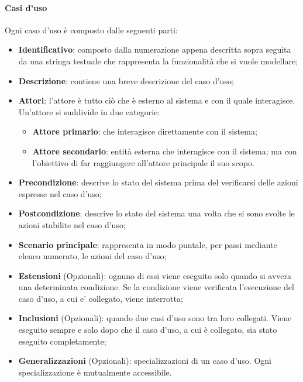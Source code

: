 \paragraph{Casi d'uso}\mbox{}
\label{Casi d'uso}
\noindent
Ogni caso d'uso è composto dalle seguenti parti:
      \begin{itemize}
      \item \textbf{Identificativo}: composto dalla numerazione appena descritta sopra seguita da una stringa testuale che rappresenta la funzionalità che si vuole modellare;
      \item \textbf{Descrizione}: contiene una breve descrizione del caso d'uso;
      \item \textbf{Attori}: l'attore è  tutto ciò che è esterno al sistema e con il quale interagisce. Un'attore si suddivide in due categorie:
        \begin{itemize}
        \item \textbf{Attore primario}: che interagisce direttamente con il sistema;
        \item \textbf{Attore secondario}: entità esterna che interagisce con il sistema; ma con l'obiettivo di far raggiungere all'attore principale il suo scopo.
        \end{itemize}
      \item \textbf{Precondizione}: descrive lo stato del sistema prima del verificarsi delle azioni espresse nel caso d'uso;
      \item \textbf{Postcondizione}: descrive lo stato del sistema una volta che si sono svolte le azioni stabilite nel caso d'uso;
      \item \textbf{Scenario principale}: rappresenta in modo puntale, per passi mediante elenco numerato, le azioni del caso d'uso;
      \item \textbf{Estensioni} (Opzionali): ognuno di essi viene eseguito solo quando si avvera una determinata condizione. Se la condizione viene verificata l'esecuzione del caso d'uso, a cui e' collegato, viene interrotta;
      \item \textbf{Inclusioni} (Opzionali): quando due casi d'uso sono tra loro collegati. Viene eseguito sempre e solo dopo che il caso d'uso, a cui è collegato, sia stato eseguito completamente;
      \item \textbf{Generalizzazioni} (Opzionali): specializzazioni di un caso d'uso. Ogni specializzazione è mutualmente accessibile.
      \end{itemize}
      

